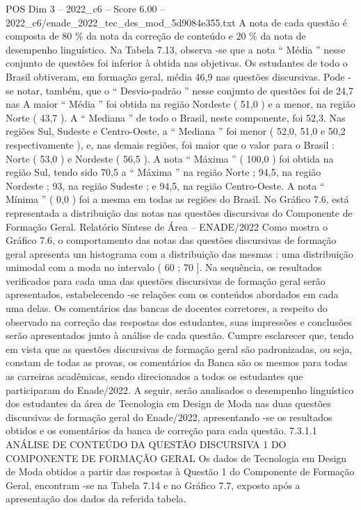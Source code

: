 \begin{textsample}{POS Dim 3 – 2022\_c6 – Score 6.00 – 2022\_c6/enade\_2022\_tec\_des\_mod\_5d9084e355.txt}
A nota de cada questão é composta de 80 \% da nota da correção de conteúdo e 20 \% da nota de desempenho linguístico.
Na Tabela 7.13, observa -se que a nota “ Média ” nesse conjunto de questões foi inferior à obtida nas objetivas.
Os estudantes de todo o Brasil obtiveram, em formação geral, média 46,9 nas questões discursivas.
Pode -se notar, também, que o “ Desvio-padrão ” nesse conjunto de questões foi de 24,7 nas A maior “ Média ” foi obtida na região Nordeste ( 51,0 ) e a menor, na região Norte ( 43,7 ).
A “ Mediana ” de todo o Brasil, neste componente, foi 52,3.
Nas regiões Sul, Sudeste e Centro-Oeste, a “ Mediana ” foi menor ( 52,0, 51,0 e 50,2 respectivamente ), e, nas demais regiões, foi maior que o valor para o Brasil : Norte ( 53,0 ) e Nordeste ( 56,5 ).
A nota “ Máxima ” ( 100,0 ) foi obtida na região Sul, tendo sido 70,5 a “ Máxima ” na região Norte ; 94,5, na região Nordeste ; 93, na região Sudeste ; e 94,5, na região Centro-Oeste.
A nota “ Mínima ” ( 0,0 ) foi a mesma em todas as regiões do Brasil.
No Gráfico 7.6, está representada a distribuição das notas nas questões discursivas do Componente de Formação Geral.
Relatório Síntese de Área – ENADE/2022 Como mostra o Gráfico 7.6, o comportamento das notas das questões discursivas de formação geral apresenta um histograma com a distribuição das mesmas : uma distribuição unimodal com a moda no intervalo ( 60 ; 70 ].
Na sequência, os resultados verificados para cada uma das questões discursivas de formação geral serão apresentados, estabelecendo -se relações com os conteúdos abordados em cada uma delas.
Os comentários das bancas de docentes corretores, a respeito do observado na correção das respostas dos estudantes, suas impressões e conclusões serão apresentados junto à análise de cada questão.
Cumpre esclarecer que, tendo em vista que as questões discursivas de formação geral são padronizadas, ou seja, constam de todas as provas, os comentários da Banca são os mesmos para todas as carreiras acadêmicas, sendo direcionados a todos os estudantes que participaram do Enade/2022.
A seguir, serão analisados o desempenho linguístico dos estudantes da área de Tecnologia em Design de Moda nas duas questões discursivas de formação geral do Enade/2022, apresentando -se os resultados obtidos e os comentários da banca de correção para cada questão. 7.3.1.1 ANÁLISE DE CONTEÚDO DA QUESTÃO DISCURSIVA 1 DO COMPONENTE DE FORMAÇÃO GERAL Os dados de Tecnologia em Design de Moda obtidos a partir das respostas à Questão 1 do Componente de Formação Geral, encontram -se na Tabela 7.14 e no Gráfico 7.7, exposto após a apresentação dos dados da referida tabela.

\end{textsample}
